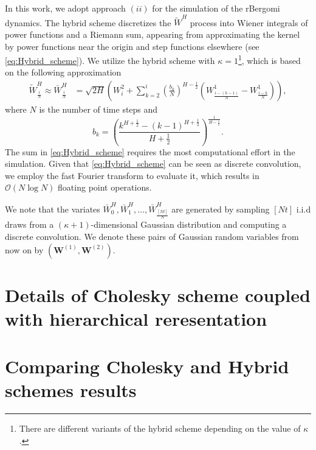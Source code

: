 \documentclass[11pt]{article}
\newcommand{\PERIOD}{.}
\newcommand{\COMMA}{,}
\newcommand{\Ordo}[1]{{\mathcal{O}}\left(#1\right)}
\begin{document}
In this work, we adopt approach  $(ii)$ for the simulation of the rBergomi dynamics. The hybrid scheme discretizes the  $\widetilde{W}^H$ process into Wiener integrals of power functions and a Riemann sum, appearing from approximating the kernel by power functions near the origin and step functions elsewhere (see \eqref{eq:Hybrid_scheme}). We utilize the hybrid scheme with $\kappa=1$\footnote{There are different variants of the hybrid scheme depending on the value of $\kappa$.}, which is based on the following approximation
\begin{align}\label{eq:Hybrid_scheme}
\widetilde{W}^H_{\frac{i}{N}} \approx \bar{W}^H_{\frac{i}{N}}&= \sqrt{2H} \left(  W^2_i+\sum_{k=2}^{i} \left(\frac{b_k}{N}\right)^{H-\frac{1}{2}} \left(W_{\frac{i-(k-1)}{N}}^1-W_{\frac{i-k}{N}}^1\right)\right)\COMMA
\end{align}
where $N$ is the number of time steps and 
$$ b_k=\left(\frac{k^{H+\frac{1}{2}}-(k-1)^{H+\frac{1}{2} }}{H+\frac{1}{2}}\right)^{\frac{1}{H-\frac{1}{2}}} \PERIOD$$
The sum in \eqref{eq:Hybrid_scheme} requires the most computational effort in the simulation. Given that \eqref{eq:Hybrid_scheme} can be seen as discrete convolution, we employ the fast Fourier transform to evaluate it, which results in  $\Ordo{N \log N}$ floating point operations.

We note that the variates $\bar{W}_0^{H},\bar{W}_1^{H},\dots,\bar{W}_{\frac{[Nt]}{N}}^{H}$ are  generated by sampling $[Nt]$ i.i.d draws from a $(\kappa+1)$-dimensional Gaussian distribution and computing a discrete convolution. We denote these pairs  of Gaussian random variables from now on by $(\mathbf{W}^{(1)},\mathbf{W}^{(2)})$.



\section{Details of Cholesky scheme coupled with hierarchical reresentation}\label{sec:Details of Cholesky scheme coupled with hierarchical reresentation}




\section{Comparing Cholesky and Hybrid schemes results }
\end{document}
